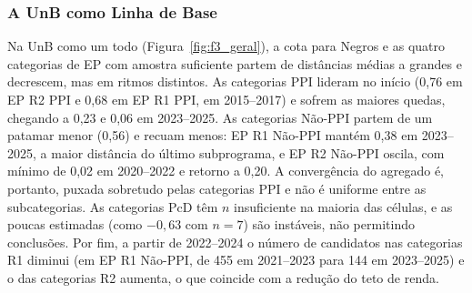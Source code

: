 \documentclass[12pt]{article}
\begin{document}




\subsubsection{A UnB como Linha de Base}
Na UnB como um todo (Figura~\ref{fig:f3_geral}), a cota para Negros e as quatro categorias de EP com amostra suficiente partem de distâncias médias a grandes e decrescem, mas em ritmos distintos. As categorias PPI lideram no início (0,76 em EP R2 PPI e 0,68 em EP R1 PPI, em 2015--2017) e sofrem as maiores quedas, chegando a 0,23 e 0,06 em 2023--2025. As categorias Não-PPI partem de um patamar menor (0,56) e recuam menos: EP R1 Não-PPI mantém 0,38 em 2023--2025, a maior distância do último subprograma, e EP R2 Não-PPI oscila, com mínimo de 0,02 em 2020--2022 e retorno a 0,20. A convergência do agregado é, portanto, puxada sobretudo pelas categorias PPI e não é uniforme entre as subcategorias. As categorias PcD têm $n$ insuficiente na maioria das células, e as poucas estimadas (como $-0{,}63$ com $n=7$) são instáveis, não permitindo conclusões. Por fim, a partir de 2022--2024 o número de candidatos nas categorias R1 diminui (em EP R1 Não-PPI, de 455 em 2021--2023 para 144 em 2023--2025) e o das categorias R2 aumenta, o que coincide com a redução do teto de renda.
\end{document}
